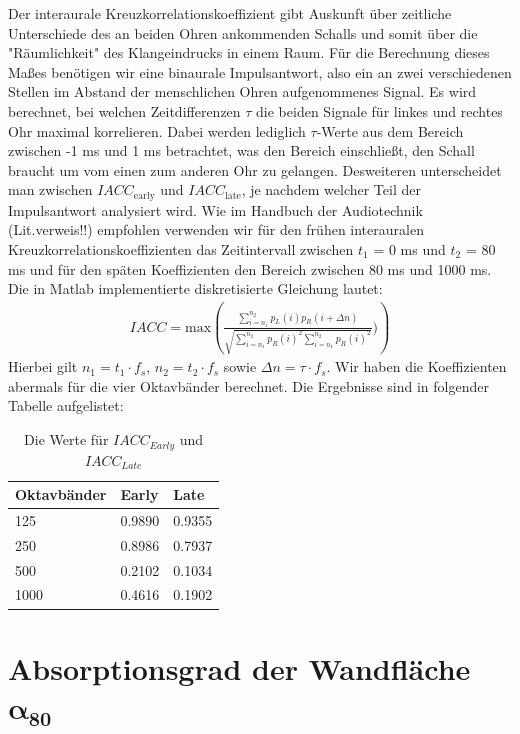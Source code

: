 Der interaurale Kreuzkorrelationskoeffizient gibt Auskunft über zeitliche Unterschiede des an beiden Ohren ankommenden Schalls und somit über die "Räumlichkeit" des Klangeindrucks in einem Raum. 
Für die Berechnung dieses Maßes benötigen wir eine binaurale Impulsantwort, also ein an zwei verschiedenen Stellen im Abstand der menschlichen Ohren aufgenommenes Signal. 
Es wird berechnet, bei welchen Zeitdifferenzen $\tau$ die beiden Signale für linkes und rechtes Ohr maximal korrelieren.
Dabei werden lediglich $\tau$-Werte aus dem Bereich zwischen -1 ms und 1 ms betrachtet, was den Bereich einschließt, den Schall braucht um vom einen zum anderen Ohr zu gelangen.  
Desweiteren unterscheidet man zwischen $IACC_{\mathrm{early}}$ und $IACC_{\mathrm{late}}$, je nachdem welcher Teil der Impulsantwort analysiert wird. Wie im Handbuch der Audiotechnik (Lit.verweis!!) empfohlen verwenden wir für den frühen interauralen Kreuzkorrelationskoeffizienten das Zeitintervall zwischen $t_1$ = 0 ms und $t_2$ = 80 ms und für den späten Koeffizienten den Bereich zwischen 80 ms und 1000 ms. 
Die in Matlab implementierte diskretisierte Gleichung lautet:
\begin{align*}
IACC = \mathrm{max}\left( \frac{\sum_{i=n_1}^{n_2} p_L(i)p_R(i+\Delta n)} {\sqrt{\sum_{i=n_1}^{n_2}p_R(i)^2 \sum_{i=n_1}^{n_2} p_R(i)^2 }})\right) 
\end{align*}
Hierbei gilt $n_1 = t_1 \cdot f_s$,  $n_2 = t_2 \cdot f_s$ sowie $\Delta n = \tau \cdot f_s$.
Wir haben die Koeffizienten abermals für die vier Oktavbänder berechnet.
Die Ergebnisse sind in folgender Tabelle aufgelistet:
\begin{table}[H]
    \centering
    \caption{Die Werte für $IACC_{Early}$ und $IACC_{Late}$}
    \label{tab:iacc}
    \begin{tabular}[\textwidth]{|l|l|l|}
        \hline
        Oktavbänder & Early & Late \\
        \hline
        125 & 0.9890 & 0.9355 \\
        \hline
        250 & 0.8986 & 0.7937 \\
        \hline
        500 & 0.2102 & 0.1034 \\
        \hline
        1000 & 0.4616 & 0.1902 \\
        \hline
    \end{tabular}
\end{table}

\section{Absorptionsgrad der Wandfläche $\mathbf{\alpha_{80}}$}
\label{sec:alpha}

